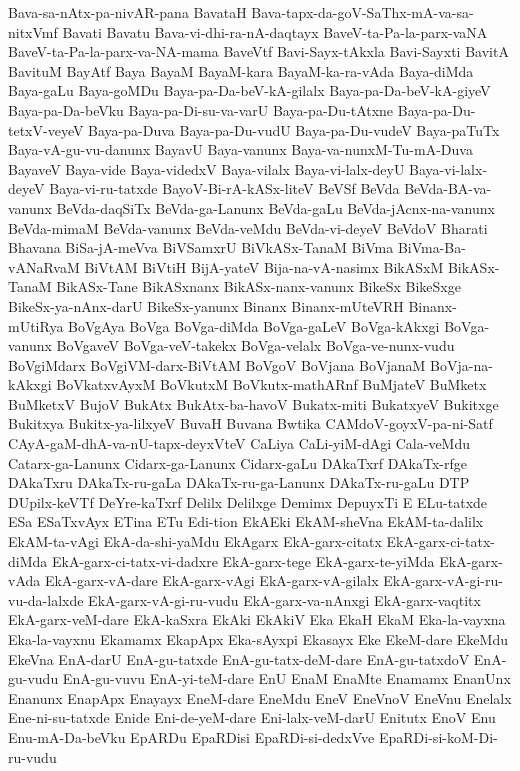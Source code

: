 {Bava-sa-nAtx-pa-nivAR-pana
BavataH
Bava-tapx-da-goV-SaThx-mA-va-sa-nitxVmf
Bavati
Bavatu
Bava-vi-dhi-ra-nA-daqtayx
BaveV-ta-Pa-la-parx-vaNA
BaveV-ta-Pa-la-parx-va-NA-mama
BaveVtf
Bavi-Sayx-tAkxla
Bavi-Sayxti
BavitA
BavituM
BayAtf
Baya
BayaM
BayaM-kara
BayaM-ka-ra-vAda
Baya-diMda
Baya-gaLu
Baya-goMDu
Baya-pa-Da-beV-kA-gilalx
Baya-pa-Da-beV-kA-giyeV
Baya-pa-Da-beVku
Baya-pa-Di-su-va-varU
Baya-pa-Du-tAtxne
Baya-pa-Du-tetxV-veyeV
Baya-pa-Duva
Baya-pa-Du-vudU
Baya-pa-Du-vudeV
Baya-paTuTx
Baya-vA-gu-vu-danunx
BayavU
Baya-vanunx
Baya-va-nunxM-Tu-mA-Duva
BayaveV
Baya-vide
Baya-videdxV
Baya-vilalx
Baya-vi-lalx-deyU
Baya-vi-lalx-deyeV
Baya-vi-ru-tatxde
BayoV-Bi-rA-kASx-liteV
BeVSf
BeVda
BeVda-BA-va-vanunx
BeVda-daqSiTx
BeVda-ga-Lanunx
BeVda-gaLu
BeVda-jAcnx-na-vanunx
BeVda-mimaM
BeVda-vanunx
BeVda-veMdu
BeVda-vi-deyeV
BeVdoV
Bharati
Bhavana
BiSa-jA-meVva
BiVSamxrU
BiVkASx-TanaM
BiVma
BiVma-Ba-vANaRvaM
BiVtAM
BiVtiH
BijA-yateV
Bija-na-vA-nasimx
BikASxM
BikASx-TanaM
BikASx-Tane
BikASxnanx
BikASx-nanx-vanunx
BikeSx
BikeSxge
BikeSx-ya-nAnx-darU
BikeSx-yanunx
Binanx
Binanx-mUteVRH
Binanx-mUtiRya
BoVgAya
BoVga
BoVga-diMda
BoVga-gaLeV
BoVga-kAkxgi
BoVga-vanunx
BoVgaveV
BoVga-veV-takekx
BoVga-velalx
BoVga-ve-nunx-vudu
BoVgiMdarx
BoVgiVM-darx-BiVtAM
BoVgoV
BoVjana
BoVjanaM
BoVja-na-kAkxgi
BoVkatxvAyxM
BoVkutxM
BoVkutx-mathARnf
BuMjateV
BuMketx
BuMketxV
BujoV
BukAtx
BukAtx-ba-havoV
Bukatx-miti
BukatxyeV
Bukitxge
Bukitxya
Bukitx-ya-lilxyeV
BuvaH
Buvana
Bwtika
CAMdoV-goyxV-pa-ni-Satf
CAyA-gaM-dhA-va-nU-tapx-deyxVteV
CaLiya
CaLi-yiM-dAgi
Cala-veMdu
Catarx-ga-Lanunx
Cidarx-ga-Lanunx
Cidarx-gaLu
DAkaTxrf
DAkaTx-rfge
DAkaTxru
DAkaTx-ru-gaLa
DAkaTx-ru-ga-Lanunx
DAkaTx-ru-gaLu
DTP
DUpilx-keVTf
DeYre-kaTxrf
Delilx
Delilxge
Demimx
DepuyxTi
E
ELu-tatxde
ESa
ESaTxvAyx
ETina
ETu
Edi-tion
EkAEki
EkAM-sheVna
EkAM-ta-dalilx
EkAM-ta-vAgi
EkA-da-shi-yaMdu
EkAgarx
EkA-garx-citatx
EkA-garx-ci-tatx-diMda
EkA-garx-ci-tatx-vi-dadxre
EkA-garx-tege
EkA-garx-te-yiMda
EkA-garx-vAda
EkA-garx-vA-dare
EkA-garx-vAgi
EkA-garx-vA-gilalx
EkA-garx-vA-gi-ru-vu-da-lalxde
EkA-garx-vA-gi-ru-vudu
EkA-garx-va-nAnxgi
EkA-garx-vaqtitx
EkA-garx-veM-dare
EkA-kaSxra
EkAki
EkAkiV
Eka
EkaH
EkaM
Eka-la-vayxna
Eka-la-vayxnu
Ekamamx
EkapApx
Eka-sAyxpi
Ekasayx
Eke
EkeM-dare
EkeMdu
EkeVna
EnA-darU
EnA-gu-tatxde
EnA-gu-tatx-deM-dare
EnA-gu-tatxdoV
EnA-gu-vudu
EnA-gu-vuvu
EnA-yi-teM-dare
EnU
EnaM
EnaMte
Enamamx
EnanUnx
Enanunx
EnapApx
Enayayx
EneM-dare
EneMdu
EneV
EneVnoV
EneVnu
Enelalx
Ene-ni-su-tatxde
Enide
Eni-de-yeM-dare
Eni-lalx-veM-darU
Enitutx
EnoV
Enu
Enu-mA-Da-beVku
EpARDu
EpaRDisi
EpaRDi-si-dedxVve
EpaRDi-si-koM-Di-ru-vudu
}
